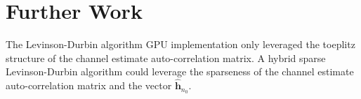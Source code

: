 \section{Further Work}
The Levinson-Durbin algorithm GPU implementation only leveraged the toeplitz structure of the channel estimate auto-correlation matrix.
A hybrid sparse Levinson-Durbin algorithm could leverage the sparseness of the channel estimate auto-correlation matrix and the vector $\hat{\mathbf{h}}_{n_0}$.